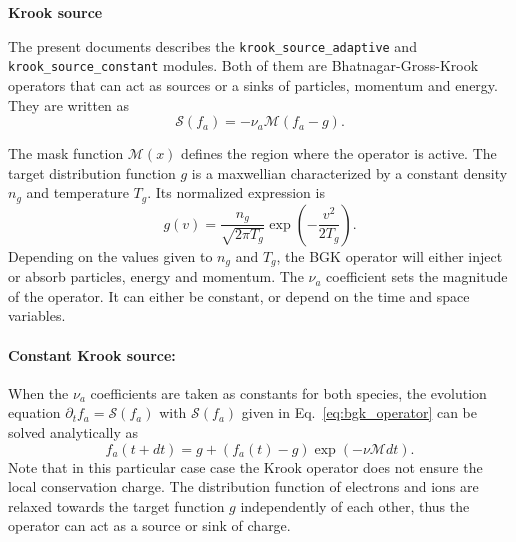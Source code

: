\documentclass[11pt]{article}
\begin{document}
\begin{center}
    \LARGE \textbf{Krook source} \\
    \vspace{0.8cm} 
\end{center}

The present documents describes the \texttt{krook\_source\_adaptive} and \texttt{krook\_source\_constant} modules. Both of them are Bhatnagar-Gross-Krook operators \cite{BGK_Operator} that can act as sources or a sinks of particles, momentum and energy. They are written as
%
%
\begin{equation}\label{eq:bgk_operator}
\mathcal{S}(f_a) = - \nu_a \mathcal{M}\left( f_a - g \right).   
\end{equation}
%

%
The mask function $\mathcal{M}(x)$ defines the region where the operator is active. The target distribution function $g$ is a maxwellian characterized by a constant density $n_g$ and temperature $T_g$. Its normalized expression is 
%
\[ g(v) = \dfrac{n_g}{\sqrt{2\pi T_g} } \operatorname{exp} \left( - \dfrac{v^2}{2 T_g}  \right). \]
%
Depending on the values given to $n_g$ and $T_g$, the BGK operator will either inject or absorb particles, energy and momentum. The $\nu_a$ coefficient sets the magnitude of the operator. It can either be constant, or depend on the time and space variables.

\paragraph{Constant Krook source:} When the $\nu_a$ coefficients are taken as constants for both species, the evolution equation $\partial_{t}f_a = \mathcal{S}(f_a)$ with $\mathcal{S}(f_a)$ given in Eq.~\ref{eq:bgk_operator} can be solved analytically as
\[ f_a(t+dt) = g + (f_a(t) - g)\operatorname{exp} \left( - \nu \mathcal{M} dt \right). \]
Note that in this particular case case the Krook operator does not ensure the local conservation charge. The distribution function of electrons and ions are relaxed towards the target function $g$ independently of each other, thus the operator can act as a source or sink of charge.
\end{document}
